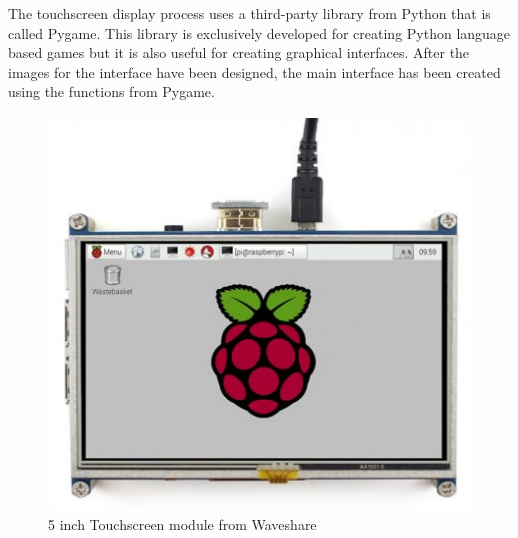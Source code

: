 The touchscreen display process uses a third-party library from Python that is called Pygame. This library is exclusively developed for creating Python language based games but it is also useful for creating graphical interfaces. After the images for the interface have been designed, the main interface has been created using the functions from Pygame. 
\begin{figure}[!ht]
	\includegraphics[scale=0.6]{content/images/touschreen5inc.jpg}
	\caption{5 inch Touchscreen module from Waveshare}
	\label{fig:touschreen5inc}
\end{figure}

